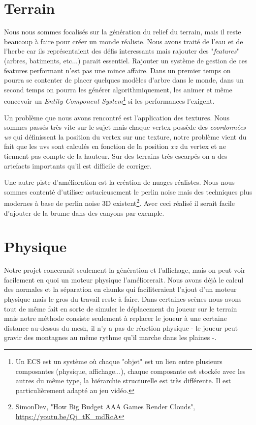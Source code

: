 \documentclass{EPUProjetDi}
\begin{document}
\section{Terrain}

Nous nous sommes focalisés sur la génération du relief du terrain, mais il reste beaucoup à faire pour créer un monde réaliste. Nous avons traité de l'eau et de l'herbe car ils représentaient des défis interessants mais rajouter des "\textit{features}" (arbres, batiments, etc...) parait essentiel. Rajouter un système de gestion de ces features performant n'est pas une mince affaire. Dans un premier temps on pourra se contenter de placer quelques modèles d'arbre dans le monde, dans un second temps on pourra les générer algorithmiquement, les animer et même concevoir un \textit{Entity Component System}\footnote{Un ECS est un système où chaque "objet" est un lien entre plusieurs composantes (physique, affichage...), chaque composante est stockée avec les autres du même type, la hiérarchie structurelle est très différente. Il est particulièrement adapté au jeu vidéo.} si les performances l'exigent.

\par
Un problème que nous avons rencontré est l'application des textures. Nous sommes passés très vite sur le sujet mais chaque vertex possède des \textit{coordonnées-uv} qui définissent la position du vertex sur une texture, notre problème vient du fait que les uvs sont calculés en fonction de la position $xz$ du vertex et ne tiennent pas compte de la hauteur. Sur des terrains très escarpés on a des artefacts importants qu'il est difficile de corriger.

\par
Une autre piste d'amélioration est la création de nuages réalistes. Nous nous sommes contenté d'utiliser astucieusement le perlin noise mais des techniques plus modernes à base de perlin noise 3D existent\footnote{SimonDev, "How Big Budget AAA Games Render Clouds", \url{https://youtu.be/Qj_tK_mdRcA}}. Avec ceci réalisé il serait facile d'ajouter de la brume dans des canyons par exemple.

\section{Physique}

Notre projet concernait seulement la génération et l'affichage, mais on peut voir facilement en quoi un moteur physique l'améliorerait. Nous avons déjà le calcul des normales et la séparation en chunks qui faciliteraient l'ajout d'un moteur physique mais le gros du travail reste à faire. Dans certaines scènes nous avons tout de même fait en sorte de simuler le déplacement du joueur sur le terrain mais notre méthode consiste seulement à replacer le joueur à une certaine distance au-dessus du mesh, il n'y a pas de réaction physique - le joueur peut gravir des montagnes au même rythme qu'il marche dans les plaines -.
\end{document}

